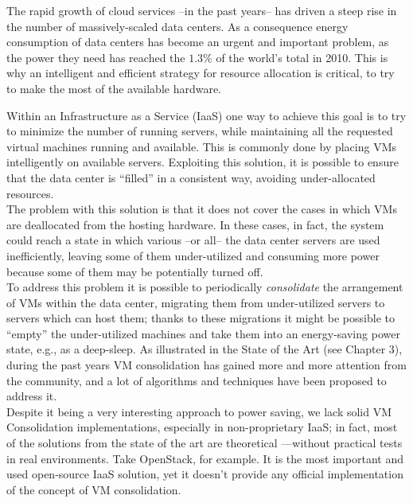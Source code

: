 

The rapid growth of cloud services --in the past years-- has driven a steep rise in the number of massively-scaled data centers. As a consequence energy consumption of data centers has become an urgent and important problem, as the power they need has reached the $1.3\%$ of the world’s total in 2010\cite{Koomey:2011vr}. This is why an intelligent and efficient strategy for resource allocation is critical, to try to make the most of the available hardware.

Within an Infrastructure as a Service (IaaS) one way to achieve this goal is to try to minimize the number of running servers, while maintaining all the requested virtual machines running and available. This is commonly done by placing VMs intelligently on available servers. Exploiting this solution, it is possible to ensure that the data center is ``filled'' in a consistent way, avoiding under-allocated resources.\\
The problem with this solution is that it does not cover the cases in which VMs are deallocated from the hosting hardware. In these cases, in fact, the system could reach a state in which various --or all-- the data center servers are used inefficiently, leaving some of them under-utilized and consuming more power because some of them may be potentially turned off.\\
To address this problem it is possible to periodically \textit{consolidate} the arrangement of VMs within the data center, migrating them from under-utilized servers to servers which can host them; thanks to these migrations it might be possible to ``empty'' the under-utilized machines and take them into an energy-saving power state, e.g., as a deep-sleep. As illustrated in the State of the Art (see Chapter 3), during the past years VM consolidation has gained more and more attention from the community, and a lot of algorithms and techniques have been proposed to address it.\\
Despite it being a very interesting approach to power saving, we lack solid VM Consolidation implementations, especially in non-proprietary IaaS; in fact, most of the solutions from the state of the art are theoretical ---without practical tests in real environments. Take OpenStack, for example. It is the most important and used open-source IaaS solution, yet it doesn’t provide any official implementation of the concept of VM consolidation.

